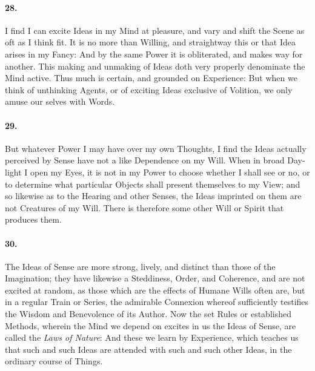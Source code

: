 \documentclass[]{article}
\newenvironment{sectionbody}{\begin{multicols}{2}}{\end{multicols}}
\begin{document}
\begin{sectionbody}
\paragraph{28.} I find I can excite Ideas in my Mind at pleasure, and vary and
shift the Scene as oft as I think fit.  It is no more than
Willing, and straightway this or that Idea arises in my Fancy:
And by the same Power it is obliterated, and makes way for
another.  This making and unmaking of Ideas doth very properly
denominate the Mind active.  Thus much is certain, and grounded
on Experience: But when we think of unthinking Agents, or of
exciting Ideas exclusive of Volition, we only amuse our selves
with Words.



\paragraph{29.} But whatever Power I may have over my own Thoughts, I find the
Ideas actually perceived by Sense have not a like Dependence on
my Will.  When in broad Day-light I open my Eyes, it is not in my
Power to choose whether I shall see or no, or to determine what
particular Objects shall present themselves to my View; and so
likewise as to the Hearing and other Senses, the Ideas imprinted
on them are not Creatures of my Will.  There is therefore some
other Will or Spirit that produces them.



\paragraph{30.} The Ideas of Sense are more strong, lively, and distinct than
those of the Imagination; they have likewise a Steddiness, Order,
and Coherence, and are not excited at random, as those which are
the effects of Humane Wills often are, but in a regular Train or
Series, the admirable Connexion whereof sufficiently testifies
the Wisdom and Benevolence of its Author.  Now the set Rules or
established Methods, wherein the Mind we depend on excites in us
the Ideas of Sense, are called the \emph{Laws of Nature}: And
these we learn by Experience, which teaches us that such and such
Ideas are attended with such and such other Ideas, in the
ordinary course of Things.




\end{sectionbody}
\end{document}
